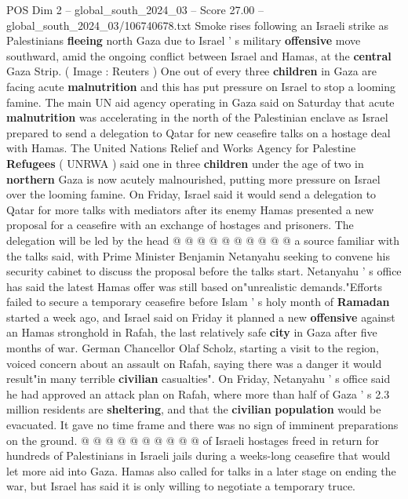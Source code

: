 \begin{textsample}{POS Dim 2 – global\_south\_2024\_03 – Score 27.00 – global\_south\_2024\_03/106740678.txt}  \label{ex:f2_pos_009}
Smoke rises following an Israeli strike as Palestinians \textbf{fleeing} north Gaza due to Israel ' s military \textbf{offensive} move southward, amid the ongoing conflict between Israel and Hamas, at the \textbf{central} Gaza Strip. ( Image : Reuters ) One out of every three \textbf{children} in Gaza are facing acute \textbf{malnutrition} and this has put pressure on Israel to stop a looming famine.
The main UN aid agency operating in Gaza said on Saturday that acute \textbf{malnutrition} was accelerating in the north of the Palestinian enclave as Israel prepared to send a delegation to Qatar for new ceasefire talks on a hostage deal with Hamas.
The United Nations Relief and Works Agency for Palestine \textbf{Refugees} ( UNRWA ) said one in three \textbf{children} under the age of two in \textbf{northern} Gaza is now acutely malnourished, putting more pressure on Israel over the looming famine.
On Friday, Israel said it would send a delegation to Qatar for more talks with mediators after its enemy Hamas presented a new proposal for a ceasefire with an exchange of hostages and prisoners.
The delegation will be led by the head @ @ @ @ @ @ @ @ @ @ a source familiar with the talks said, with Prime Minister Benjamin Netanyahu seeking to convene his security cabinet to discuss the proposal before the talks start.
Netanyahu ' s office has said the latest Hamas offer was still based on"unrealistic demands."Efforts failed to secure a temporary ceasefire before Islam ' s holy month of \textbf{Ramadan} started a week ago, and Israel said on Friday it planned a new \textbf{offensive} against an Hamas stronghold in Rafah, the last relatively safe \textbf{city} in Gaza after five months of war.
German Chancellor Olaf Scholz, starting a visit to the region, voiced concern about an assault on Rafah, saying there was a danger it would result"in many terrible \textbf{civilian} casualties".
On Friday, Netanyahu ' s office said he had approved an attack plan on Rafah, where more than half of Gaza ' s 2.3 million residents are \textbf{sheltering}, and that the \textbf{civilian} \textbf{population} would be evacuated.
It gave no time frame and there was no sign of imminent preparations on the ground. @ @ @ @ @ @ @ @ @ @ of Israeli hostages freed in return for hundreds of Palestinians in Israeli jails during a weeks-long ceasefire that would let more aid into Gaza.
Hamas also called for talks in a later stage on ending the war, but Israel has said it is only willing to negotiate a temporary truce.

\end{textsample}
